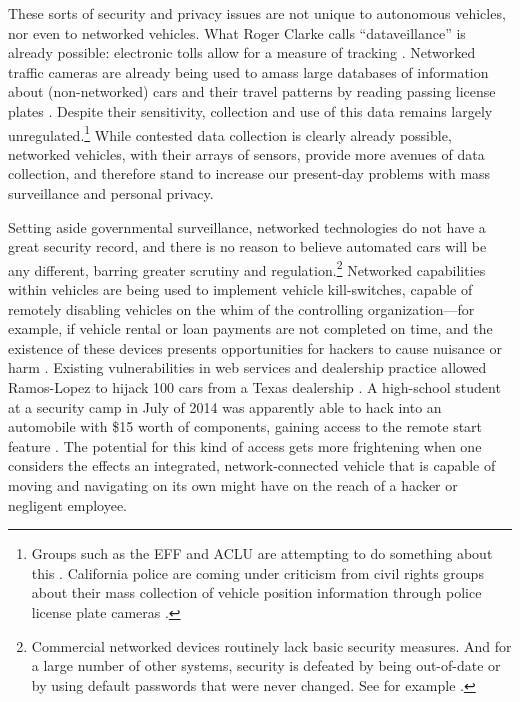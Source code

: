 
These sorts of security and privacy issues are not unique to
autonomous vehicles, nor even to networked vehicles. What Roger Clarke
calls ``dataveillance'' is already possible: electronic tolls
allow for a measure of tracking \cite[p. 25]{nissenbaum}. Networked
traffic cameras are 
already being used to amass large databases of information about
(non-networked) cars and their travel patterns by reading passing
license plates \cite[p. 26]{nissenbaum}. 
Despite their sensitivity, collection and use of this data
remains largely unregulated.\footnote{Groups such as the EFF and ACLU
  are attempting to do something about this \cite{kayyaliEFF}. California police are coming under 
criticism from civil rights groups about their mass collection of
vehicle position information through police license plate cameras \cite{maassCivil}.}
While contested data collection is clearly already
possible, networked vehicles, with their arrays of sensors,
provide more avenues of data collection, and therefore stand to
increase our present-day problems with mass surveillance and personal
privacy.

Setting aside governmental surveillance, networked technologies do not
have a great security record, 
and there is no reason to believe automated cars will be any
different, barring greater scrutiny and
regulation.\footnote{Commercial networked devices routinely lack basic
security measures. And for a large number of other systems, security
is defeated by being out-of-date or by using default passwords that
were never changed. See for example \cite{zetter}.}
Networked capabilities within vehicles are being used to
implement vehicle kill-switches, capable of remotely disabling
vehicles on the whim of the controlling organization---for example, if
vehicle rental or loan payments are not completed on time, and the existence of these devices
presents opportunities for hackers to cause nuisance or
harm \cite{goodman}.
Existing vulnerabilities in web services and dealership practice
allowed Ramos-Lopez to hijack 100 cars from a Texas dealership
\cite{poulsenHacker}. A high-school student at a security camp in July
of 2014 was apparently 
able to hack into an automobile with \$15 worth of components, gaining
access to the remote start 
feature \cite{bigelow14}.
The potential for this kind of access gets more frightening when one
considers the effects an integrated, network-connected vehicle that is capable of
moving and navigating on its own might have on the reach of a hacker or negligent employee.

